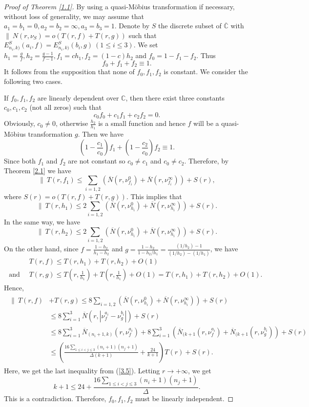 \documentclass[12pt,leqno]{amsart}
\newcommand{\C}{{\mathbb{C}}}
\numberwithin{equation}{section}
\begin{document}
\begin{proof}[Proof of Theorem \ref{1.1}]
By using a quasi-M\"obius transformation if necessary, without loss of generality, we may assume that $a_1=b_1=0,a_2=b_2=\infty, a_3=b_3=1$. Denote by $S$ the discrete subset of $\overline\C$ with $\|\ N(r,\nu_S)=o(T(r,f)+T(r,g))$ such that $E^S_{n_i,k)}(a_i,f)=E^S_{n_i,k)}(b_i,g)\ (1\le i\le 3)$. We set $h_1=\frac{g}{f},h_2=\frac{g-1}{f-1},f_1=ch_1,f_2=(1-c)h_2$ and $f_0=1-f_1-f_2$. Thus
$$f_0+f_1+f_2\equiv 1.$$ 
It follows from the supposition that none of $f_0,f_1,f_2$ is constant. We consider the following two cases.

If $f_0,f_1,f_2$ are linearly dependent over $\mathbb{C}$, then there exist three constants $c_0,c_1,c_2$ (not all zeros) such that
$$c_0f_0+c_1f_1+c_2f_2=0.$$
Obviously, $c_0\neq 0$, otherwise $\frac{h_2}{h_1}$ is a small function and hence $f$ will be a quasi-M\"{o}bius transformation $g$. Then we have
$$\left(1-\dfrac{c_1}{c_0}\right)f_1+\left(1-\dfrac{c_2}{c_0}\right)f_2\equiv 1.$$
Since both $f_1$ and $f_2$ are not constant so $c_0\ne c_1$ and $c_0\ne c_2$. Therefore, by Theorem \ref{2.1} we have
$$\|\ T(r,f_1)\le \sum_{i=1,2}\left(\overline N\left(r,\nu^0_{f_i}\right)+\overline N\left(r,\nu^\infty_{f_i}\right)\right)+S(r),$$
where $S(r)=o(T(r,f)+T(r,g))$. This implies that
$$\|\ T(r,h_1)\le 2\sum_{i=1,2}\left(\overline N\left(r,\nu^0_{h_i}\right)+\overline N\left(r,\nu^\infty_{h_i}\right)\right)+S(r).$$
In the same way, we have 
$$\|\ T(r,h_2)\le 2\sum_{i=1,2}\left(\overline N\left(r,\nu^0_{h_i}\right)+\overline N\left(r,\nu^\infty_{h_i}\right)\right)+S(r).$$
On the other hand, since $f=\frac{1-h_2}{h_1-h_2}$ and $g=\frac{1-h_2}{1-h_2/h_1}=\frac{(1/h_2)-1}{(1/h_2)-(1/h_1)}$, we have
\begin{align*}
&T(r,f)\le T(r,h_1)+T(r,h_2)+O(1) \\ 
\text{ and }\ & T(r,g)\le T\left(r,\frac{1}{h_1}\right)+T\left(r,\frac{1}{h_1}\right)+O(1)=T(r,h_1)+T(r,h_2)+O(1).
\end{align*}
Hence, 
\begin{align}\label{3.10}
\begin{split}
\|\ T(r,f)&+T(r,g)\le 8\sum_{i=1,2}\left(\overline N(r,\nu^0_{h_i})+\overline N(r,\nu^\infty_{h_i})\right)+S(r)\\ 
&\le 8\sum_{i=1}^3\overline N(r,|\nu^{a_i}_f-\nu^{b_i}_g|)+S(r)\\
&\le 8\sum_{i=1}^3\overline N_{(n_i+1,k)}(r,\nu^{a_i}_f)+8\sum_{i=1}^3\left(\overline N_{(k+1}(r,\nu^{a_i}_f)+\overline N_{(k+1}(r,\nu^{b_i}_g) \right)+S(r)\\
&\le \left(\frac{16\sum_{1\le i<j\le 3}(n_i+1)(n_j+1)}{\Delta(k+1)}+\frac{24}{k+1}\right)T(r)+S(r).
\end{split}
\end{align}
Here, we get the last inequality from  (\ref{3.5}). Letting $r\rightarrow +\infty$, we get 
$$ k+1\le 24+\frac{16\sum_{1\le i<j\le 3}(n_i+1)(n_j+1)}{\Delta}.$$
This is a contradiction. Therefore, $f_0,f_1,f_2$ must be linearly independent. 


\end{proof}
\end{document}
